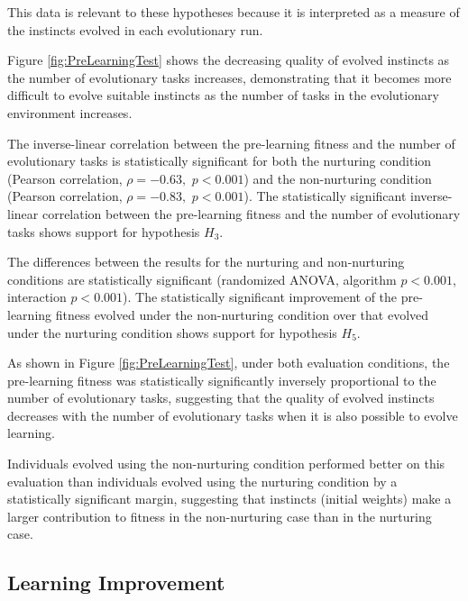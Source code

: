 \documentclass[master]{outhesis}
\begin{document}
This data is relevant to these hypotheses because it is interpreted as a measure of the instincts evolved in each evolutionary run.

Figure \ref{fig:PreLearningTest} shows the decreasing quality of evolved instincts as the number of evolutionary tasks increases,
demonstrating that it becomes more difficult to evolve suitable instincts as the number of tasks in the evolutionary environment increases.

The inverse-linear correlation between the pre-learning fitness and the number of evolutionary tasks is statistically significant for both 
the nurturing condition (Pearson correlation, $\rho=-0.63,$ $p < 0.001$)
and the non-nurturing condition (Pearson correlation, $\rho=-0.83,$ $p < 0.001$).
The statistically significant inverse-linear correlation between the pre-learning fitness and the number of evolutionary tasks shows support for hypothesis $H_3$.

The differences between the results for the nurturing and non-nurturing conditions are statistically significant (randomized ANOVA, algorithm $p < 0.001$, interaction $p < 0.001$).
The statistically significant improvement of the pre-learning fitness evolved under the non-nurturing condition over that evolved under the nurturing condition shows support for hypothesis $H_5$.

As shown in Figure \ref{fig:PreLearningTest},
under both evaluation conditions, the pre-learning fitness was statistically significantly inversely proportional to the number of evolutionary tasks,
suggesting that the quality of evolved instincts decreases with the number of evolutionary tasks when it is also possible to evolve learning.

Individuals evolved using the non-nurturing condition performed better on this evaluation than individuals evolved using the nurturing condition by a statistically significant margin,
suggesting that instincts (initial weights) make a larger contribution to fitness in the non-nurturing case than in the nurturing case.

\subsection{Learning Improvement}
\end{document}
